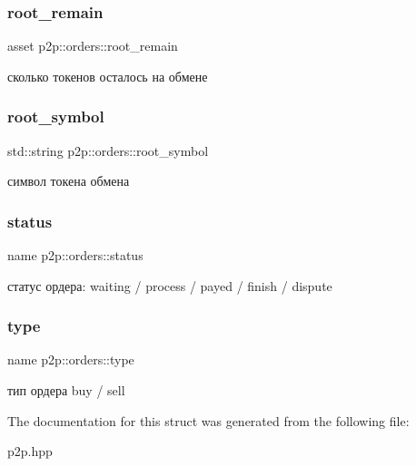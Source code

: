 \subsubsection{\texorpdfstring{root\+\_\+remain}{root\_remain}}
{\footnotesize\ttfamily asset p2p\+::orders\+::root\+\_\+remain}

сколько токенов осталось на обмене \mbox{\label{structp2p_1_1orders_aa2030987fac872badf6682757cd75a6c}} 
\subsubsection{\texorpdfstring{root\+\_\+symbol}{root\_symbol}}
{\footnotesize\ttfamily std\+::string p2p\+::orders\+::root\+\_\+symbol}

символ токена обмена \mbox{\label{structp2p_1_1orders_a0a4acd537d4a6ac966469faa648b43f2}} 
\subsubsection{\texorpdfstring{status}{status}}
{\footnotesize\ttfamily name p2p\+::orders\+::status}

статус ордера\+: waiting / process / payed / finish / dispute \mbox{\label{structp2p_1_1orders_a60ac740af13940b35f388cb2c17c4f3a}} 
\subsubsection{\texorpdfstring{type}{type}}
{\footnotesize\ttfamily name p2p\+::orders\+::type}

тип ордера buy / sell 

The documentation for this struct was generated from the following file\+:\begin{DoxyCompactItemize}
\item 
p2p.\+hpp\end{DoxyCompactItemize}

